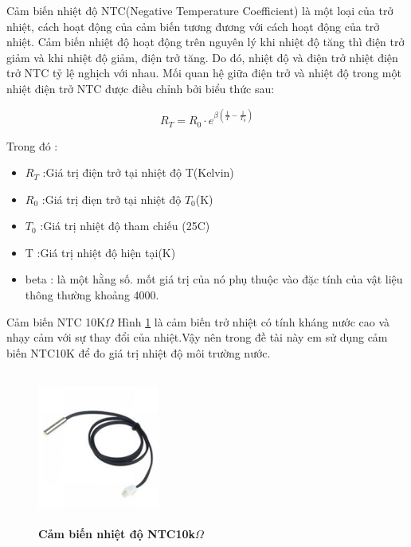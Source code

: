 \documentclass{article} %
\begin{document}
	
	Cảm biến nhiệt độ NTC(Negative Temperature Coefficient) là một loại của trở nhiệt, cách hoạt động của cảm biến tương đương với cách hoạt động của trở nhiệt. Cảm biến nhiệt độ hoạt động trên nguyên lý khi nhiệt độ tăng thì điện trở giảm và khi nhiệt độ giảm, điện trở tăng. Do đó, nhiệt độ và điện trở nhiệt điện trở NTC tỷ lệ nghịch với nhau. Mối quan hệ giữa điện trở và nhiệt độ trong một nhiệt điện trở NTC được điều chỉnh bởi biểu thức sau\cite{NTC}: 
	
	\begin{equation}
		R_T = R_0 \cdot e^{\beta \left(\frac{1}{T} - \frac{1}{T_0}\right)}
	\end{equation}
	
	
	Trong đó :
	
	\begin{itemize}
		\item $R_T$ :Giá trị điện trở tại nhiệt độ T(Kelvin)
		\item $R_0$ :Giá trị điẹn trở tại nhiệt độ $T_0$(K)
		\item $T_0$ :Giá trị nhiệt độ tham chiếu (25\textdegree C)
		\item T :Giá trị nhiệt độ hiện tại(K)
		\item beta : là một hằng số. mốt giá trị của nó phụ thuộc vào đặc tính của vật liệu thông thường khoảng 4000.
	\end{itemize}
	
	Cảm biến NTC 10K$\Omega$ Hình \ref{NTC10k} là cảm biến trở nhiệt có tính kháng nước cao và nhạy cảm với sự thay đổi của nhiệt.Vậy nên trong đề tài này em sử dụng cảm biến NTC10K để đo giá trị nhiệt độ môi trường nước.
	
	\begin{figure}[!ht]
		\centering
		\includegraphics[width=4cm,height=5cm]{Images/NTC10k.png}
		\caption[Cảm biến nhiệt độ NTC 10k$\Omega$ \cite{NTC}]{\bfseries \fontsize{12pt}{0pt}\selectfont Cảm biến nhiệt độ NTC10k$\Omega$ \cite{NTC}}
		\label{NTC10k}
	\end{figure}
	
\end{document}
